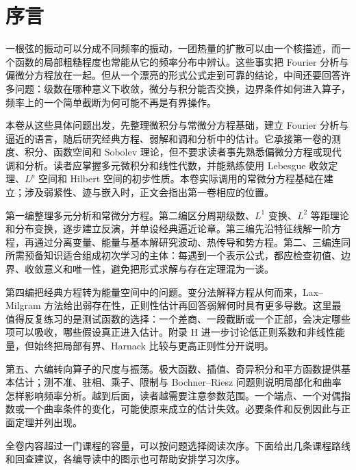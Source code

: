 \chapter*{序言}

一根弦的振动可以分成不同频率的振动，一团热量的扩散可以由一个核描述，而一个函数的局部粗糙程度也常能从它的频率分布中辨认。这些事实把 Fourier 分析与偏微分方程放在一起。但从一个漂亮的形式公式走到可靠的结论，中间还要回答许多问题：级数在哪种意义下收敛，微分与积分能否交换，边界条件如何进入算子，频率上的一个简单截断为何可能不再是有界操作。

\ProseParagraphBreak

本卷从这些具体问题出发，先整理微积分与常微分方程基础，建立 Fourier 分析与逼近的语言，随后研究经典方程、弱解和调和分析中的估计。它承接第一卷的测度、积分、函数空间和 Sobolev 理论，但不要求读者事先熟悉偏微分方程或现代调和分析。读者应掌握多元微积分和线性代数，并能熟练使用 Lebesgue 收敛定理、\(L^p\) 空间和 Hilbert 空间的初步性质。本卷实际调用的常微分方程基础在建立；涉及弱紧性、迹与嵌入时，正文会指出第一卷相应的位置。

\ProseParagraphBreak

第一编整理多元分析和常微分方程。第二编区分周期级数、\(L^1\) 变换、\(L^2\) 等距理论和分布变换，逐步建立反演，并单设经典逼近论章。第三编先沿特征线解一阶方程，再通过分离变量、能量与基本解研究波动、热传导和势方程。第二、三编连同所需预备知识适合组成初次学习的主体：每遇到一个表示公式，都应检查初值、边界、收敛意义和唯一性，避免把形式求解与存在定理混为一谈。

\ProseParagraphBreak

第四编把经典方程转为能量空间中的问题。变分法解释方程从何而来，Lax--Milgram 方法给出弱存在性，正则性估计再回答弱解何时具有更多导数。这里最值得反复练习的是测试函数的选择：一个差商、一段截断或一个正部，会决定哪些项可以吸收，哪些假设真正进入估计。附录 H 进一步讨论低正则系数和非线性能量，但始终把局部有界、Harnack 比较与更高正则性分开说明。

\ProseParagraphBreak

第五、六编转向算子的尺度与振荡。极大函数、插值、奇异积分和平方函数提供基本估计；测不准、驻相、乘子、限制与 Bochner--Riesz 问题则说明局部化和曲率怎样影响频率分析。越到后面，读者越需要注意参数范围。一个端点、一个对偶指数或一个曲率条件的变化，可能使原来成立的估计失效。必要条件和反例因此与正面定理并列出现。

\ProseParagraphBreak

全卷内容超过一门课程的容量，可以按问题选择阅读次序。下面给出几条课程路线和回查建议，各编导读中的图示也可帮助安排学习次序。


